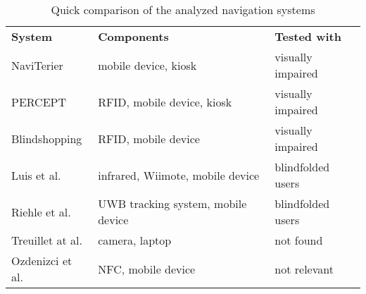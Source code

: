\begin{table}[htbp]
  \centering
  \caption{Quick comparison of the analyzed navigation systems}
  \label{tab:navSysComp}
 \renewcommand{\arraystretch}{1.2}
    \begin{tabularx}{\textwidth}{p{2.6cm}|X|X}
    \rowcolor{mygray}
    \textbf{System} & \textbf{Components} & \textbf{Tested with} \\
    NaviTerier & mobile device, kiosk & visually impaired  \\ \hline
    PERCEPT & RFID, mobile device, kiosk & visually impaired  \\ \hline
    Blindshopping & RFID, mobile device & visually impaired \\ \hline
    Luis et al. & infrared, Wiimote, mobile device & blindfolded users \\ \hline
    Riehle et al. & UWB tracking system, mobile device & blindfolded users \\ \hline
    Treuillet at al. & camera, laptop & not found \\ \hline
    Ozdenizci et al. & NFC, mobile device & not relevant \\
    \end{tabularx}%
\end{table}%


